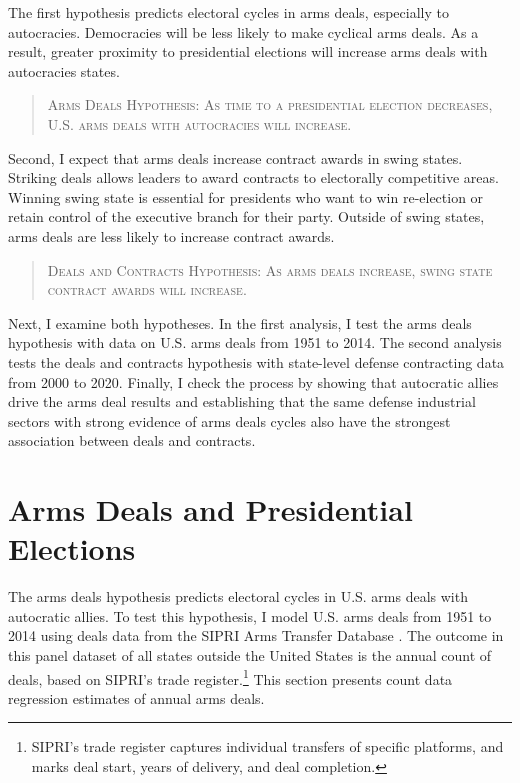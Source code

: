\documentclass[12pt]{article}
\begin{document}
The first hypothesis predicts electoral cycles in arms deals, especially to autocracies.
Democracies will be less likely to make cyclical arms deals. 
As a result, greater proximity to presidential elections will increase arms deals with autocracies states. 


\begin{quote}
\textsc{Arms Deals Hypothesis: As time to a presidential election decreases, U.S. arms deals with autocracies will increase.}
\end{quote}


Second, I expect that arms deals increase contract awards in swing states.
Striking deals allows leaders to award contracts to electorally competitive areas. 
Winning swing state is essential for presidents who want to win re-election or retain control of the executive branch for their party. 
Outside of swing states, arms deals are less likely to increase contract awards. 


\begin{quote}
\textsc{Deals and Contracts Hypothesis: As arms deals increase, swing state contract awards will increase.}
\end{quote}


Next, I examine both hypotheses. 
In the first analysis, I test the arms deals hypothesis with data on U.S. arms deals from 1951 to 2014.  
The second analysis tests the deals and contracts hypothesis with state-level defense contracting data from 2000 to 2020. 
Finally, I check the process by showing that autocratic allies drive the arms deal results and establishing that the same defense industrial sectors with strong evidence of arms deals cycles also have the strongest association between deals and contracts. 


\section{Arms Deals and Presidential Elections}


The arms deals hypothesis predicts electoral cycles in U.S. arms deals with autocratic allies.
To test this hypothesis, I model U.S. arms deals from 1951 to 2014 using deals data from the SIPRI Arms Transfer Database \citep{SIPRI2021}.
The outcome in this panel dataset of all states outside the United States is the annual count of deals, based on SIPRI's trade register.\footnote{SIPRI's trade register captures individual transfers of specific platforms, and marks deal start, years of delivery, and deal completion.}
This section presents count data regression estimates of annual arms deals. 
\end{document}
